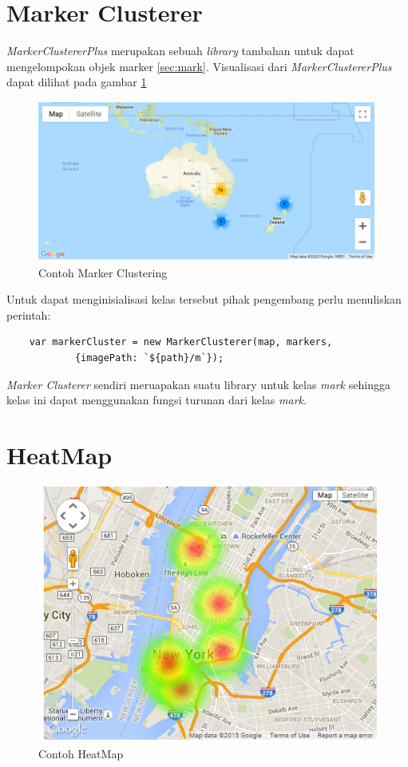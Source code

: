 \section{Marker Clusterer}
 \textit{MarkerClustererPlus} merupakan sebuah \textit{library} tambahan untuk dapat mengelompokan objek marker \ref{sec:mark}. Visualisasi dari \textit{MarkerClustererPlus} dapat dilihat pada gambar \ref{fig:mcp}
\begin{figure}[H]
	\centering
	\includegraphics[scale=0.5]{Gambar/marker_clustering.PNG}
	\caption{Contoh Marker Clustering}
	\label{fig:mcp}
\end{figure}
Untuk dapat  menginisialisasi kelas tersebut pihak pengembang perlu menuliskan perintah:
\begin{lstlisting}
    var markerCluster = new MarkerClusterer(map, markers,
            {imagePath: `${path}/m`});
\end{lstlisting}
\textit{Marker Clusterer} sendiri meruapakan suatu library untuk kelas \textit{mark} sehingga kelas ini dapat menggunakan fungsi turunan dari kelas \textit{mark}.

\section{HeatMap}
\begin{figure}[H]
	\centering
	\includegraphics[scale=0.8]{Gambar/heat-map-example.png}
	\caption{Contoh HeatMap}
	\label{fig:sechm}
\end{figure}


